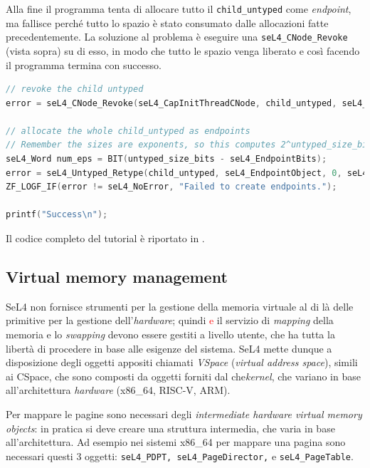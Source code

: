 Alla fine il programma tenta di allocare tutto il \texttt{child\_untyped} come \textit{endpoint}, ma fallisce perché tutto lo spazio è stato consumato dalle allocazioni fatte precedentemente. La soluzione al problema è eseguire una \texttt{seL4\_CNode\_Revoke} (vista sopra) su di esso, in modo che tutto le spazio venga liberato e così facendo il programma termina con successo. 
\begin{lstlisting}[language=C++]
// revoke the child untyped
error = seL4_CNode_Revoke(seL4_CapInitThreadCNode, child_untyped, seL4_WordBits);

// allocate the whole child_untyped as endpoints
// Remember the sizes are exponents, so this computes 2^untyped_size_bits / 2^seL4_EndpointBits:
seL4_Word num_eps = BIT(untyped_size_bits - seL4_EndpointBits);
error = seL4_Untyped_Retype(child_untyped, seL4_EndpointObject, 0, seL4_CapInitThreadCNode, 0, 0, child_tcb, num_eps);
ZF_LOGF_IF(error != seL4_NoError, "Failed to create endpoints.");

printf("Success\n");
\end{lstlisting}
Il codice completo del tutorial è riportato in \cite{untyped}.

\subsection{Virtual memory management}
SeL4 non fornisce strumenti per la gestione della memoria virtuale al di là delle primitive per la gestione dell'\textit{hardware}; quindi \textcolor{red}{e} il servizio di \textit{mapping} della memoria e lo \textit{swapping} devono essere gestiti a livello utente, che ha tutta la libertà di procedere in base alle esigenze del sistema. SeL4 mette dunque a disposizione degli oggetti appositi chiamati \textit{VSpace} (\textit{virtual address space}), simili ai CSpace, che sono composti da oggetti forniti dal  che\textit{kernel}, che variano in base all'architettura \textit{hardware} (x86\_64, RISC-V, ARM).

Per mappare le pagine sono necessari degli \textit{intermediate hardware virtual memory objects}: in pratica si deve creare una struttura intermedia, che varia in base all'architettura. Ad esempio nei sistemi x86\_64 per mappare una pagina sono necessari questi 3 oggetti: \texttt{seL4\_PDPT, seL4\_PageDirector,} e \texttt{seL4\_PageTable}. 

